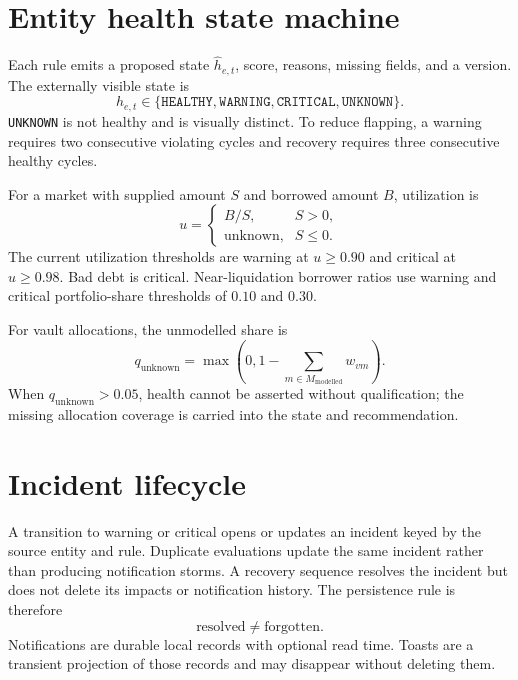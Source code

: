 \documentclass[11pt,a4paper]{article}
\begin{document}
\section{Entity health state machine}

Each rule emits a proposed state $\hat h_{e,t}$, score, reasons, missing fields,
and a version.  The externally visible state is
\begin{equation}
h_{e,t}\in\{\texttt{HEALTHY},\texttt{WARNING},\texttt{CRITICAL},\texttt{UNKNOWN}\}.
\end{equation}
\texttt{UNKNOWN} is not healthy and is visually distinct.  To reduce flapping,
a warning requires two consecutive violating cycles and recovery requires three
consecutive healthy cycles.

For a market with supplied amount $S$ and borrowed amount $B$, utilization is
\begin{equation}
u=\begin{cases}B/S,&S>0,\\\text{unknown},&S\leq0.\end{cases}
\end{equation}
The current utilization thresholds are warning at $u\geq0.90$ and critical at
$u\geq0.98$.  Bad debt is critical.  Near-liquidation borrower ratios use
warning and critical portfolio-share thresholds of $0.10$ and $0.30$.

For vault allocations, the unmodelled share is
\begin{equation}
q_{\mathrm{unknown}}=\max\left(0,1-\sum_{m\in M_{\mathrm{modelled}}}w_{vm}\right).
\end{equation}
When $q_{\mathrm{unknown}}>0.05$, health cannot be asserted without qualification;
the missing allocation coverage is carried into the state and recommendation.

\section{Incident lifecycle}

A transition to warning or critical opens or updates an incident keyed by the
source entity and rule.  Duplicate evaluations update the same incident rather
than producing notification storms.  A recovery sequence resolves the incident
but does not delete its impacts or notification history.  The persistence rule
is therefore
\begin{equation}
\text{resolved}\neq\text{forgotten}.
\end{equation}
Notifications are durable local records with optional read time.  Toasts are a
transient projection of those records and may disappear without deleting them.
\end{document}
